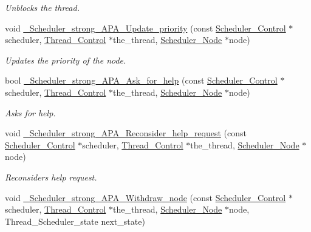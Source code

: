 \begin{DoxyCompactItemize}
\begin{DoxyCompactList}\small\item\em Unblocks the thread. \end{DoxyCompactList}\item 
void \mbox{\hyperlink{group__RTEMSScoreSchedulerStrongAPA_ga3cdc0079d2d16a392834bd03b5115ad9}{\+\_\+\+Scheduler\+\_\+strong\+\_\+\+A\+P\+A\+\_\+\+Update\+\_\+priority}} (const \mbox{\hyperlink{struct__Scheduler__Control}{Scheduler\+\_\+\+Control}} $\ast$scheduler, \mbox{\hyperlink{struct__Thread__Control}{Thread\+\_\+\+Control}} $\ast$the\+\_\+thread, \mbox{\hyperlink{structScheduler__Node}{Scheduler\+\_\+\+Node}} $\ast$node)
\begin{DoxyCompactList}\small\item\em Updates the priority of the node. \end{DoxyCompactList}\item 
bool \mbox{\hyperlink{group__RTEMSScoreSchedulerStrongAPA_gad863eddc3fa4e2d785fb64af6505e90b}{\+\_\+\+Scheduler\+\_\+strong\+\_\+\+A\+P\+A\+\_\+\+Ask\+\_\+for\+\_\+help}} (const \mbox{\hyperlink{struct__Scheduler__Control}{Scheduler\+\_\+\+Control}} $\ast$scheduler, \mbox{\hyperlink{struct__Thread__Control}{Thread\+\_\+\+Control}} $\ast$the\+\_\+thread, \mbox{\hyperlink{structScheduler__Node}{Scheduler\+\_\+\+Node}} $\ast$node)
\begin{DoxyCompactList}\small\item\em Asks for help. \end{DoxyCompactList}\item 
void \mbox{\hyperlink{group__RTEMSScoreSchedulerStrongAPA_ga7809e64065ec5d291f3dc82220a68d3f}{\+\_\+\+Scheduler\+\_\+strong\+\_\+\+A\+P\+A\+\_\+\+Reconsider\+\_\+help\+\_\+request}} (const \mbox{\hyperlink{struct__Scheduler__Control}{Scheduler\+\_\+\+Control}} $\ast$scheduler, \mbox{\hyperlink{struct__Thread__Control}{Thread\+\_\+\+Control}} $\ast$the\+\_\+thread, \mbox{\hyperlink{structScheduler__Node}{Scheduler\+\_\+\+Node}} $\ast$node)
\begin{DoxyCompactList}\small\item\em Reconsiders help request. \end{DoxyCompactList}\item 
void \mbox{\hyperlink{group__RTEMSScoreSchedulerStrongAPA_gaf43eb65a6fbbe2826ca4cec68a930cb5}{\+\_\+\+Scheduler\+\_\+strong\+\_\+\+A\+P\+A\+\_\+\+Withdraw\+\_\+node}} (const \mbox{\hyperlink{struct__Scheduler__Control}{Scheduler\+\_\+\+Control}} $\ast$scheduler, \mbox{\hyperlink{struct__Thread__Control}{Thread\+\_\+\+Control}} $\ast$the\+\_\+thread, \mbox{\hyperlink{structScheduler__Node}{Scheduler\+\_\+\+Node}} $\ast$node, Thread\+\_\+\+Scheduler\+\_\+state next\+\_\+state)

\end{DoxyCompactItemize}
